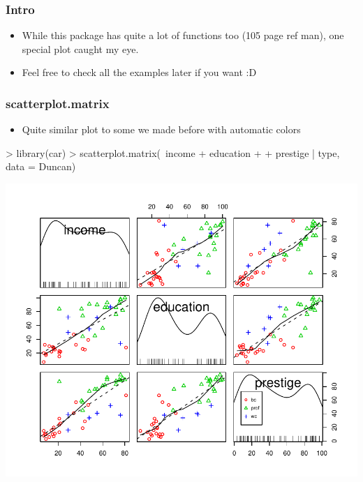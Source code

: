 \begin{frame}[allowframebreaks]
  \frametitle{Intro}
  \begin{itemize}
  \item While this package has quite a lot of functions too (105 page ref man), one special plot caught my eye.
  \item Feel free to check all the examples later if you want :D
  \end{itemize}
\end{frame}

\begin{frame}
  \frametitle{scatterplot.matrix}
  \begin{itemize}
  \item Quite similar plot to some we made before with automatic colors
  \end{itemize}
\begin{Schunk}
\begin{Sinput}
> library(car)
> scatterplot.matrix(~income + education + 
+     prestige | type, data = Duncan)
\end{Sinput}
\end{Schunk}
\includegraphics{plots/fig-038}
\end{frame}

